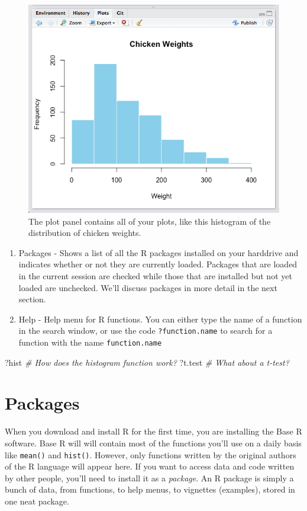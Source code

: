 \documentclass[]{book}
\newenvironment{Shaded}{\begin{snugshade}}{\end{snugshade}}
\newcommand{\CommentTok}[1]{\textcolor[rgb]{0.56,0.35,0.01}{\textit{{#1}}}}
\newcommand{\NormalTok}[1]{{#1}}
\theoremstyle{definition}
\theoremstyle{definition}
\theoremstyle{remark}
\begin{document}
\begin{figure}
\includegraphics[width=0.75\linewidth]{images/plotpanelss} \caption{The plot panel contains all of your plots, like this histogram of the distribution of chicken weights.}\label{fig:plotpanel}
\end{figure}

\begin{enumerate}
\def\labelenumi{\arabic{enumi}.}
\setcounter{enumi}{2}
\item
  Packages - Shows a list of all the R packages installed on your
  harddrive and indicates whether or not they are currently loaded.
  Packages that are loaded in the current session are checked while
  those that are installed but not yet loaded are unchecked. We'll
  discuss packages in more detail in the next section.
\item
  Help - Help menu for R functions. You can either type the name of a
  function in the search window, or use the code \texttt{?function.name}
  to search for a function with the name \texttt{function.name}
\end{enumerate}

\begin{Shaded}
\begin{Highlighting}[]
\NormalTok{?hist   }\CommentTok{# How does the histogram function work?}
\NormalTok{?t.test }\CommentTok{# What about a t-test?}
\end{Highlighting}
\end{Shaded}

\section{Packages}\label{packages}

When you download and install R for the first time, you are installing
the Base R software. Base R will will contain most of the functions
you'll use on a daily basis like \texttt{mean()} and \texttt{hist()}.
However, only functions written by the original authors of the R
language will appear here. If you want to access data and code written
by other people, you'll need to install it as a \emph{package}. An R
package is simply a bunch of data, from functions, to help menus, to
vignettes (examples), stored in one neat package.
\end{document}
